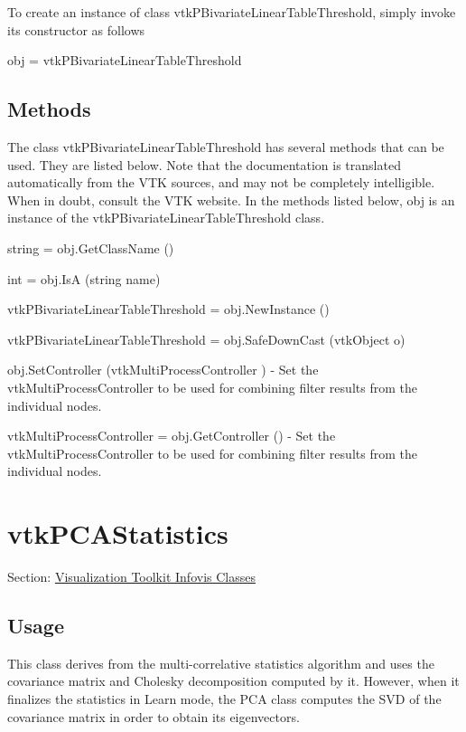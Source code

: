 To create an instance of class vtk\-P\-Bivariate\-Linear\-Table\-Threshold, simply invoke its constructor as follows \begin{DoxyVerb}  obj = vtkPBivariateLinearTableThreshold
\end{DoxyVerb}
 \hypertarget{vtkwidgets_vtkxyplotwidget_Methods}{}\subsection{Methods}\label{vtkwidgets_vtkxyplotwidget_Methods}
The class vtk\-P\-Bivariate\-Linear\-Table\-Threshold has several methods that can be used. They are listed below. Note that the documentation is translated automatically from the V\-T\-K sources, and may not be completely intelligible. When in doubt, consult the V\-T\-K website. In the methods listed below, {\ttfamily obj} is an instance of the vtk\-P\-Bivariate\-Linear\-Table\-Threshold class. 
\begin{DoxyItemize}
\item {\ttfamily string = obj.\-Get\-Class\-Name ()}  
\item {\ttfamily int = obj.\-Is\-A (string name)}  
\item {\ttfamily vtk\-P\-Bivariate\-Linear\-Table\-Threshold = obj.\-New\-Instance ()}  
\item {\ttfamily vtk\-P\-Bivariate\-Linear\-Table\-Threshold = obj.\-Safe\-Down\-Cast (vtk\-Object o)}  
\item {\ttfamily obj.\-Set\-Controller (vtk\-Multi\-Process\-Controller )} -\/ Set the vtk\-Multi\-Process\-Controller to be used for combining filter results from the individual nodes.  
\item {\ttfamily vtk\-Multi\-Process\-Controller = obj.\-Get\-Controller ()} -\/ Set the vtk\-Multi\-Process\-Controller to be used for combining filter results from the individual nodes.  
\end{DoxyItemize}\hypertarget{vtkinfovis_vtkpcastatistics}{}\section{vtk\-P\-C\-A\-Statistics}\label{vtkinfovis_vtkpcastatistics}
Section\-: \hyperlink{sec_vtkinfovis}{Visualization Toolkit Infovis Classes} \hypertarget{vtkwidgets_vtkxyplotwidget_Usage}{}\subsection{Usage}\label{vtkwidgets_vtkxyplotwidget_Usage}
This class derives from the multi-\/correlative statistics algorithm and uses the covariance matrix and Cholesky decomposition computed by it. However, when it finalizes the statistics in Learn mode, the P\-C\-A class computes the S\-V\-D of the covariance matrix in order to obtain its eigenvectors.

